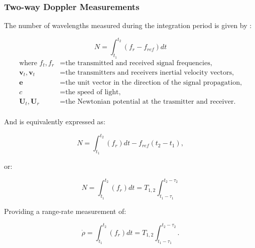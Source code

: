 \subsubsection{Two-way Doppler Measurements}

The number of wavelengths measured during the integration period is given by \cite{Montenbruck2000}:

\begin{equation}
    N = \int_{t_1}^{t_2}(f_r-f_{ref})dt
\end{equation}
\begin{equation*}
    \begin{aligned}
        \textrm{where  }
        f_t, f_r & = \textrm{the transmitted and received signal frequencies,}            \\
        \mathbf{v}_t, \mathbf{v}_t & = \textrm{the transmitters and receivers inertial velocity vectors,}   \\
        \mathbf{e}                 & = \textrm{the unit vector in the direction of the signal propagation,} \\
        c                          & = \textrm{the speed of light,}                                         \\
        \mathbf{U}_t, \mathbf{U}_r & = \textrm{the Newtonian potential at the trasmitter and receiver.}     \\
    \end{aligned}
\end{equation*}

And is equivalently expressed as:

\begin{equation}
    N = \int_{t_1}^{t_2}(f_r)dt-f_{ref}(t_2-t_1),
\end{equation}

or:

\begin{equation}
    N = \int_{t_1}^{t_2}(f_r)dt = T_{1,2}\int_{t_1-\tau_1}^{t_2-\tau_2}
\end{equation}

Providing a range-rate measurement of:

\begin{equation}
    \dot{\rho} = \int_{t_1}^{t_2}(f_r)dt = T_{1,2}\int_{t_1-\tau_1}^{t_2-\tau_2}.
\end{equation}




